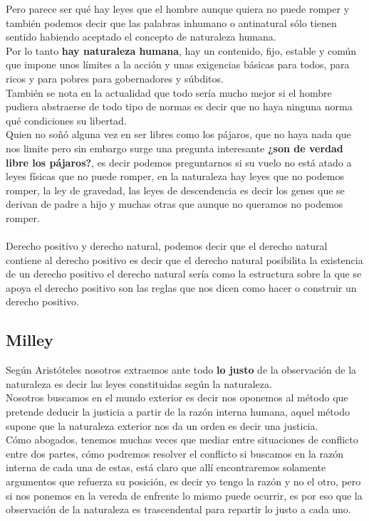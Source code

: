 \documentclass[12pt]{book}
\begin{document}
Pero parece ser qué hay leyes que el hombre aunque quiera no puede romper y también podemos decir que las palabras inhumano o antinatural sólo tienen sentido habiendo aceptado el concepto de naturaleza humana.
\\
Por lo tanto \textbf{hay naturaleza humana}, hay un contenido, fijo, estable y común que impone unos límites a la acción y unas exigencias básicas para todos, para ricos y para pobres para gobernadores y súbditos.
\\
También se nota en la actualidad que todo sería mucho mejor si el hombre pudiera abstraerse de todo tipo de normas es decir que no haya ninguna norma qué condiciones su libertad. \\
Quien no soñ\'o alguna vez en ser libres como los pájaros, que no haya nada que nos limite pero sin embargo surge una pregunta interesante \textbf{¿son de verdad libre los pájaros?}, 
es decir podemos preguntarnos si su vuelo no está atado a leyes físicas que no puede romper, en la naturaleza hay leyes que no podemos romper, la ley de gravedad, las leyes de descendencia es decir los genes que se derivan de padre a hijo y muchas otras que aunque no queramos no podemos romper.
\\ \\
Derecho positivo y derecho natural, podemos decir que el derecho natural contiene al derecho positivo es decir que el derecho natural posibilita la existencia de un derecho positivo el derecho natural sería como la estructura sobre la que se apoya el derecho positivo son las reglas que nos dicen como hacer o construir un derecho positivo.
\subsection{Milley}
Según Aristóteles nosotros extraemos ante todo \textbf{lo justo} de la observación de la naturaleza es decir las leyes constituidas según la naturaleza.
\\
Nosotros buscamos en el mundo exterior es decir nos oponemos al método que pretende deducir la justicia a partir de la razón interna humana, aquel método supone que la naturaleza exterior nos da un orden es decir una justicia.
\\
Cómo abogados, tenemos muchas veces que mediar entre situaciones de conflicto entre dos partes, cómo podremos resolver el conflicto si buscamos en la razón interna de cada una de estas, está claro que allí encontraremos solamente argumentos que refuerza su posici\'on, es decir yo tengo la raz\'on y no el otro, pero si nos ponemos en la vereda de enfrente lo mismo puede ocurrir, es por eso que la observación de la naturaleza es trascendental para repartir lo justo a cada uno.
\\ \\
\end{document}
